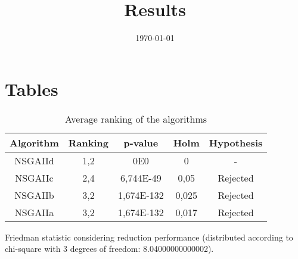 \documentclass{article}
\title{Results}
\author{}
\date{\today}
\begin{document}
\oddsidemargin 0in \topmargin 0in\maketitle

\section{Tables}
\begin{table}[!htp]
\centering
\begin{tabular}{c|c|c|c|c}
Algorithm&Ranking&p-value&Holm&Hypothesis\\
\hline
NSGAIId & 1,2 & 0E0 & 0 & -\\
NSGAIIc & 2,4 & 6,744E-49 & 0,05 & Rejected\\
NSGAIIb & 3,2 & 1,674E-132 & 0,025 & Rejected\\
NSGAIIa & 3,2 & 1,674E-132 & 0,017 & Rejected\\
\end{tabular}
\caption{Average ranking of the algorithms}
\end{table}


Friedman statistic considering reduction performance (distributed according to chi-square with 3 degrees of freedom: 8.04000000000002).
\end{document}
